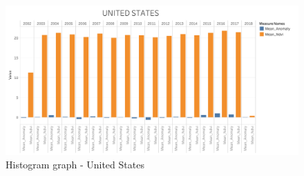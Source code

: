 \begin{itemize}
   
     \begin{figure}[H]
            \centering
            \includegraphics[width=1.0\linewidth]{figures/ch5/Histograms/US_histogram.png}
            \caption{\label{fig:US_histogram} Histogram graph - United States}
    \end{figure}
\newpage

\end{itemize}



